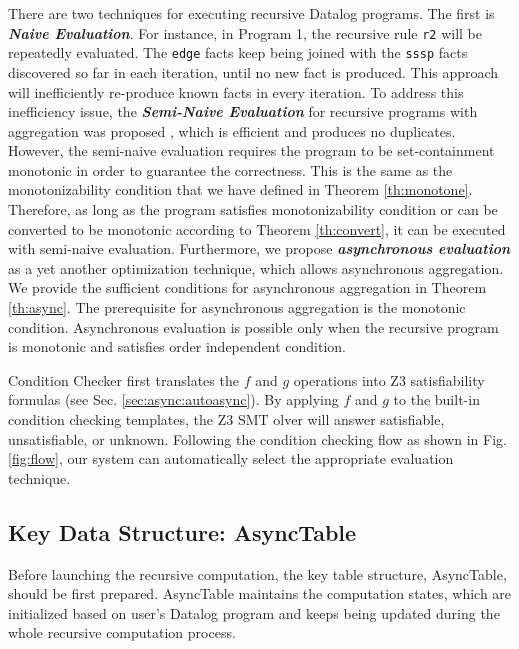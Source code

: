 There are two techniques for executing recursive Datalog programs. The first is \emph{\textbf{Naive Evaluation}}. For instance, in Program 1, the recursive rule \texttt{r2} will be repeatedly evaluated. The \texttt{edge} facts keep being joined with the \texttt{sssp} facts discovered so far in each iteration, until no new fact is produced. This approach will inefficiently re-produce known facts in every iteration. To address this inefficiency issue, the \emph{\textbf{Semi-Naive Evaluation}} for recursive programs with aggregation was proposed \cite{Lam:2013:SDE:2510649.2511289,Wang:2015:AFR:2824032.2824052}, which is efficient and produces no duplicates. However, the semi-naive evaluation requires the program to be set-containment monotonic in order to guarantee the correctness. This is the same as the monotonizability condition that we have defined in Theorem \ref{th:monotone}. Therefore, as long as the program satisfies monotonizability condition or can be converted to be monotonic according to Theorem \ref{th:convert}, it can be executed with semi-naive evaluation. Furthermore, we propose \emph{\textbf{asynchronous evaluation}} as a yet another optimization technique, which allows asynchronous aggregation. We provide the sufficient conditions for asynchronous aggregation in Theorem \ref{th:async}. The prerequisite for asynchronous aggregation is the monotonic condition. Asynchronous evaluation is possible only when the recursive program is monotonic and satisfies order independent condition.

Condition Checker first translates the $f$ and $g$ operations into Z3 \cite{DeMoura:2008:ZES:1792734.1792766} satisfiability formulas (see Sec. \ref{sec:async:autoasync}). By applying $f$ and $g$ to the built-in condition checking templates, the Z3 SMT olver will answer satisfiable, unsatisfiable, or unknown. Following the condition checking flow as shown in Fig. \ref{fig:flow}, our system can automatically select the appropriate evaluation technique.

\subsection{Key Data Structure: AsyncTable}
\label{sec:system:data}

Before launching the recursive computation, the key table structure, AsyncTable, should be first prepared. AsyncTable maintains the computation states, which are initialized based on user's Datalog program and keeps being updated during the whole recursive computation process.

